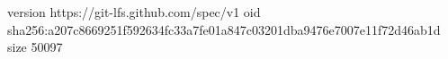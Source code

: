 version https://git-lfs.github.com/spec/v1
oid sha256:a207c8669251f592634fc33a7fe01a847c03201dba9476e7007e11f72d46ab1d
size 50097
